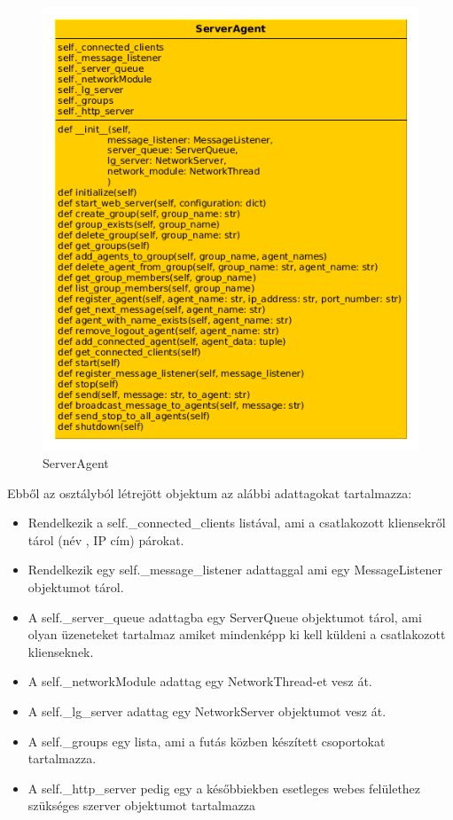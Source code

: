 \documentclass[a4paper,12pt,oneside]{report}
\begin{document}
	\begin{figure}[h]
	  \includegraphics[width=13cm, keepaspectratio]{serveragent_class.png}
	  \caption{ServerAgent }
	  \label{fig:serveragent_class}
	\end{figure}

Ebből az osztályból létrejött objektum az alábbi adattagokat tartalmazza:
\begin{itemize}
	\itemsep0em
		\item Rendelkezik a self.\_connected\_clients listával, ami a csatlakozott kliensekről tárol (név , IP cím) párokat.
		\item Rendelkezik egy self.\_message\_listener adattaggal ami egy MessageListener objektumot tárol.
		\item A self.\_server\_queue adattagba egy ServerQueue objektumot tárol, ami olyan üzeneteket tartalmaz amiket mindenképp ki kell küldeni a csatlakozott klienseknek.       
		\item A self.\_networkModule adattag egy NetworkThread-et vesz át.
		\item A self.\_lg\_server adattag egy NetworkServer objektumot vesz át.
 		\item A self.\_groups egy lista, ami a futás közben készített csoportokat tartalmazza.
		\item A self.\_http\_server pedig egy a későbbiekben esetleges webes felülethez szükséges szerver objektumot tartalmazza
\end{itemize}
\end{document}
